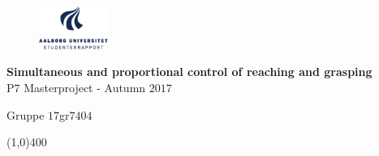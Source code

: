 \clearpage
\thispagestyle{empty}

\begin{figure}[H]
	\raggedleft
	\includegraphics[width=0.2\textwidth]{figures/aaulogo-da.png}
\end{figure} 

\vspace{5 cm}

\begin{center}	
	\begin{Huge}
		\textbf{Simultaneous and proportional control of reaching and grasping}\\
		\vspace{5 mm}
		P$7$ Masterproject - Autumn $2017$\\
		\vspace{3 mm}
	\end{Huge}
	{\Large Gruppe $17$gr$7404$}
\end{center}
\vspace*{\fill}

\begin{center}
	\line(1,0){400}
\end{center}

